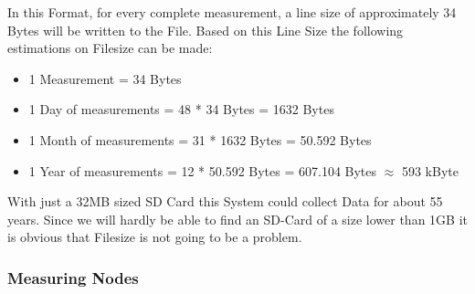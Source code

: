 \documentclass[
	11pt,
	a4paper
]{article}%
\begin{document}
In this Format, for every complete measurement, a line size of approximately 34 Bytes will be written to the File. Based on this Line Size the following estimations on Filesize can be made:
\begin{itemize}
\item 1 Measurement = 34 Bytes
\item 1 Day of measurements = 48 * 34 Bytes = 1632 Bytes
\item 1 Month of measurements = 31 * 1632 Bytes = 50.592 Bytes
\item 1 Year of measurements = 12 * 50.592 Bytes = 607.104 Bytes $\approx$ 593 kByte
\end{itemize}
With just a 32MB sized SD Card this System could collect Data for about 55 years. Since we will hardly be able to find an SD-Card of a size lower than 1GB it is obvious that Filesize is not going to be a problem.

\subsubsection{Measuring Nodes}
\end{document}
